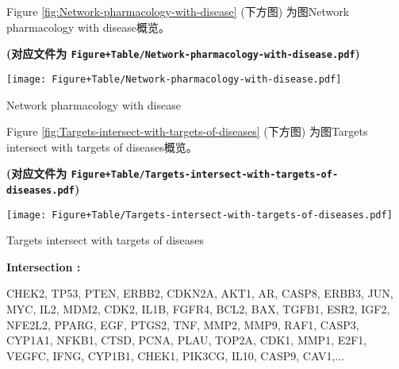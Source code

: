 \documentclass[
]{article}
\begin{document}
\begin{center}\vspace{1.5cm}\end{center}

Figure \ref{fig:Network-pharmacology-with-disease} (下方图) 为图Network pharmacology with disease概览。

\textbf{(对应文件为 \texttt{Figure+Table/Network-pharmacology-with-disease.pdf})}

\def\@captype{figure}
\begin{center}
\texttt{[image: Figure+Table/Network-pharmacology-with-disease.pdf]}
\caption{Network pharmacology with disease}\label{fig:Network-pharmacology-with-disease}
\end{center}

\begin{center}\vspace{1.5cm}\end{center}

\begin{center}\vspace{1.5cm}\end{center}

Figure \ref{fig:Targets-intersect-with-targets-of-diseases} (下方图) 为图Targets intersect with targets of diseases概览。

\textbf{(对应文件为 \texttt{Figure+Table/Targets-intersect-with-targets-of-diseases.pdf})}

\def\@captype{figure}
\begin{center}
\texttt{[image: Figure+Table/Targets-intersect-with-targets-of-diseases.pdf]}
\caption{Targets intersect with targets of diseases}\label{fig:Targets-intersect-with-targets-of-diseases}
\end{center}

\begin{center}\vspace{1.5cm}\end{center}\begin{center}\begin{tcolorbox}[colback=gray!10, colframe=gray!50, width=0.9\linewidth, arc=1mm, boxrule=0.5pt]
\textbf{
Intersection
:}

\vspace{0.5em}

    CHEK2, TP53, PTEN, ERBB2, CDKN2A, AKT1, AR, CASP8,
ERBB3, JUN, MYC, IL2, MDM2, CDK2, IL1B, FGFR4, BCL2, BAX,
TGFB1, ESR2, IGF2, NFE2L2, PPARG, EGF, PTGS2, TNF, MMP2,
MMP9, RAF1, CASP3, CYP1A1, NFKB1, CTSD, PCNA, PLAU, TOP2A,
CDK1, MMP1, E2F1, VEGFC, IFNG, CYP1B1, CHEK1, PIK3CG, IL10,
CASP9, CAV1,...

\vspace{2em}
\end{tcolorbox}
\end{center}
\end{document}
